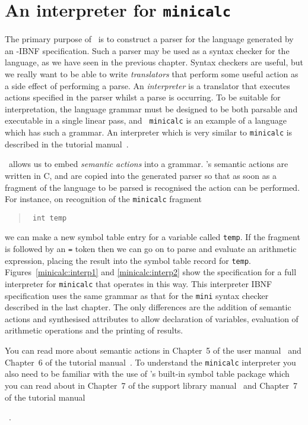 {\chapter{An interpreter for  {\tt minicalc}}

The primary purpose of \rdp\ is to construct a parser for the language
generated by an \rdp-IBNF specification. Such a parser may be used as a
syntax checker for the language, as we have seen in the previous
chapter. Syntax checkers are useful, but we really want to be able to
write {\em translators} that perform some useful action as a side effect
of performing a parse. An {\em interpreter} is a translator that
executes actions specified in the parser whilst a parse is occurring. To
be suitable for interpretation, the language grammar must be designed to
be both parsable and executable in a single linear pass, and {\tt
minicalc} is an example of a language which has such a grammar.
An interpreter which is very similar to {\tt minicalc} is described in
the tutorial manual~\cite{rdp:tut:1.5}.


\rdp\ allows us to embed {\em semantic actions} into a grammar. \rdp's
semantic actions are written in C, and are copied into the generated
parser so that as soon as a fragment of the language to be parsed is
recognised the action can be performed. For instance, on recognition of
the {\tt minicalc} fragment \begin{quote} \verb+ int temp+ \end{quote}
we can make a new symbol table entry for a variable called {\tt temp}.
If the fragment is followed by an {\tt =} token then we can go on to
parse and evaluate an arithmetic expression, placing the result into the
symbol table record for {\tt temp}. Figures~\ref{minicalc:interp1} and
\ref{minicalc:interp2} show the specification for a full interpreter for
{\tt minicalc} that operates in this way. This interpreter IBNF
specification uses the same grammar as that for the {\tt mini} syntax
checker described in the last chapter. The only differences are the
addition of semantic actions and synthesised attributes to allow
declaration of variables, evaluation of arithmetic operations and the
printing of results.

You can read more about
semantic actions in Chapter~5 of the user manual~\cite{rdp:user:1.5} and
Chapter~6 of the tutorial manual~\cite{rdp:tut:1.5}.  To understand the
{\tt minicalc} interpreter you also need to be familiar with the use of
\rdp's built-in symbol table package which you can read about in
Chapter~7 of the support library manual~\cite{rdp:supp:1.5} and
Chapter~7 of the tutorial manual}~\cite{rdp:tut:1.5}.

